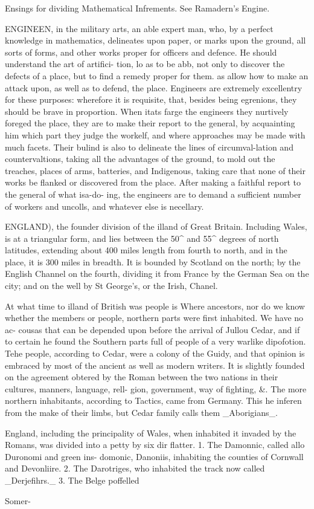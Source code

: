 Ensings for dividing Mathematical Infrements. See Ramadern’s Engine.\par\medskip
ENGINEEN, in the military arts, an able expert man, who, by a perfect knowledge in mathematics, delineates upon paper, or marks upon the ground, all sorts of forms, and other works proper for officers and defence. He should understand the art of artifici- tion, lo as to be abb, not only to discover the defects of a place, but to find a remedy proper for them. as allow how to make an attack upon, as well as to defend, the place. Engineers are extremely excellentry for these purposes: wherefore it is requisite, that, besides being egrenions, they should be brave in proportion. When itats farge the engineers they nurtively foreged the place, they are to make their report to the general, by acquainting him which part they judge the workelf, and where approaches may be made with much facets. Their bulind is also to delineate the lines of circumval-lation and countervaltions, taking all the advantages of the ground, to mold out the treaches, places of arms, batteries, and Indigenous, taking care that none of their works be flanked or discovered from the place. After making a faithful report to the general of what isa-do- ing, the engineers are to demand a sufficient number of workers and uncolls, and whatever else is necellary.\par\medskip
ENGLAND), the founder division of the illand of Great Britain. Including Wales, is at a triangular form, and lies between the 50\textasciicircum{} and 55\textasciicircum{} degrees of north latitudes, extending about 400 miles length from fourth to north, and in the place, it is 300 miles in breadth. It is bounded by Scotland on the north; by the English Channel on the fourth, dividing it from France by the German Sea on the city; and on the well by St George's, or the Irish, Chanel.\par\medskip
At what time to illand of British was people is Where ancestors, nor do we know whether the members or people, northern parts were first inhabited. We have no ac- cousas that can be depended upon before the arrival of Jullou Cedar, and if to certain he found the Southern parts full of people of a very warlike dipofotion. Tehe people, according to Cedar, were a colony of the Guidy, and that opinion is embraced by most of the ancient as well as modern writers. It is slightly founded on the agreement obtered by the Roman between the two nations in their cultures, manners, language, rell- gion, government, way of fighting, \&. The more northern inhabitants, according to Tactics, came from Germany. This he inferen from the make of their limbs, but Cedar family calls them \_Aborigians\_.\par\medskip
England, including the principality of Wales, when inhabited it invaded by the Romans, was divided into a petty by six dir flatter. 1. The Damonnic, called allo Duronomi and green ins- domonic, Danoniis, inhabiting the counties of Cornwall and Devonliire. 2. The Darotriges, who inhabited the track now called \_Derjefihrs.\_ 3. The Belge poffelled\par\medskip
Somer-\par\medskip
